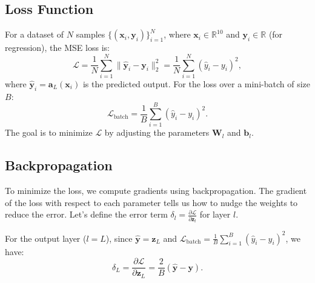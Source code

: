 \documentclass[11pt, a4paper]{article}
\begin{document}
\subsection{Loss Function}
For a dataset of $N$ samples $\{(\mathbf{x}_i, \mathbf{y}_i)\}_{i=1}^N$, where $\mathbf{x}_i \in \mathbb{R}^{10}$ and $\mathbf{y}_i \in \mathbb{R}$ (for regression), the MSE loss is:
\begin{equation}
    \mathcal{L} = \frac{1}{N} \sum_{i=1}^N \|\hat{\mathbf{y}}_i - \mathbf{y}_i\|_2^2 = \frac{1}{N} \sum_{i=1}^N (\hat{y}_i - y_i)^2, \label{eq:mse}
\end{equation}
where $\hat{\mathbf{y}}_i = \mathbf{a}_L(\mathbf{x}_i)$ is the predicted output. For the loss over a mini-batch of size $B$:
\begin{equation}
    \mathcal{L}_{\text{batch}} = \frac{1}{B} \sum_{i=1}^B (\hat{y}_i - y_i)^2.
\end{equation}
The goal is to minimize $\mathcal{L}$ by adjusting the parameters $\mathbf{W}_l$ and $\mathbf{b}_l$.

\subsection{Backpropagation}
To minimize the loss, we compute gradients using backpropagation. The gradient of the loss with respect to each parameter tells us how to nudge the weights to reduce the error. Let’s define the error term $\delta_l = \frac{\partial \mathcal{L}}{\partial \mathbf{z}_l}$ for layer $l$.

For the output layer ($l = L$), since $\hat{\mathbf{y}} = \mathbf{z}_L$ and $\mathcal{L}_{\text{batch}} = \frac{1}{B} \sum_{i=1}^B (\hat{y}_i - y_i)^2$, we have:
\begin{equation}
    \delta_L = \frac{\partial \mathcal{L}}{\partial \mathbf{z}_L} = \frac{2}{B} (\hat{\mathbf{y}} - \mathbf{y}). \label{eq:delta_output}
\end{equation}
\end{document}
